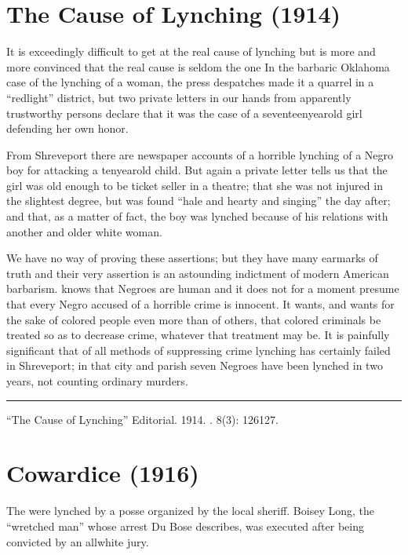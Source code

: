\documentclass[letterpaper,10pt,english]{jupyterBook}
\begin{document}
\section{The Cause of Lynching (1914)}
\label{\detokenize{Volumes/08/03/cause_of_lynching:the-cause-of-lynching-1914}}\label{\detokenize{Volumes/08/03/cause_of_lynching::doc}}
\sphinxAtStartPar
It is exceedingly difficult to get at the real cause of lynching but  is more and more convinced that the real cause is seldom the one In the barbaric Oklahoma case of the lynching of a woman, the press despatches made it a quarrel in a “redlight” district, but two private letters in our hands from apparently trustworthy persons declare that it was the case of a seventeen\sphinxhyphen{}year\sphinxhyphen{}old girl defending her own honor.

\sphinxAtStartPar
From Shreveport there are newspaper accounts of a horrible lynching of a Negro boy for attacking a ten\sphinxhyphen{}year\sphinxhyphen{}old child. But again a private letter tells us that the girl was old enough to be ticket seller in a theatre; that she was not injured in the slightest degree, but was found “hale and hearty and singing” the day after; and that, as a matter of fact, the boy was lynched because of his relations with another and older white woman.

\sphinxAtStartPar
We have no way of proving these assertions; but they have many ear\sphinxhyphen{}marks of truth and their very assertion is an astounding indictment of modern American barbarism.  knows that Negroes are human and it does not for a moment presume that every Negro accused of a horrible crime is innocent. It wants, and wants for the sake of colored people even more than of others, that colored criminals be treated so as to decrease crime, whatever that treatment may be. It is painfully significant that of all methods of suppressing crime lynching has certainly failed in Shreveport; in that city and parish seven Negroes have been lynched in two years, not counting ordinary murders.


\bigskip\hrule\bigskip


\sphinxAtStartPar
{} “The Cause of Lynching” Editorial. 1914. . 8(3): 126\sphinxhyphen{}127.


\section{Cowardice (1916)}
\label{\detokenize{Volumes/12/06/cowardice:cowardice-1916}}\label{\detokenize{Volumes/12/06/cowardice::doc}}
\begin{sphinxShadowBox}
\sphinxstylesidebartitle{}

\sphinxAtStartPar
The  were lynched by a posse organized by the local sheriff. Boisey Long, the “wretched man” whose arrest Du Bose describes, was executed after being convicted by an all\sphinxhyphen{}white jury.
\end{sphinxShadowBox}
\end{document}
